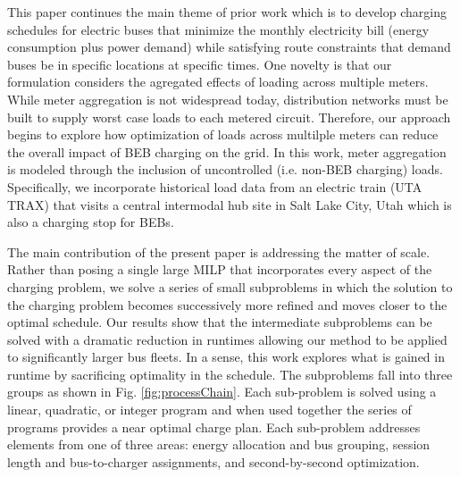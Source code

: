\par This paper continues the main theme of prior work which is to develop charging schedules for electric buses that minimize the monthly electricity bill (energy consumption plus power demand) while satisfying route constraints that demand buses be in specific locations at specific times.  One novelty is that our formulation considers the agregated effects of loading across multiple meters.  While meter aggregation is not widespread today, distribution networks must be built to supply worst case loads to each metered circuit.  Therefore, our approach begins to explore how optimization of loads across multilple meters can reduce the overall impact of BEB charging on the grid.  In this work, meter aggregation is modeled through the inclusion of uncontrolled (i.e. non-BEB charging) loads.  Specifically, we incorporate historical load data from an electric train (UTA TRAX) that visits a central intermodal hub site in Salt Lake City, Utah which is also a charging stop for BEBs.  
\par The main contribution of the present paper is addressing the matter of scale.  Rather than posing a single large MILP that incorporates every aspect of the charging problem, we solve a series of small subproblems in which the solution to the charging problem becomes successively more refined and moves closer to the optimal schedule.  Our results show that the intermediate subproblems can be solved with a dramatic reduction in runtimes allowing our method to be applied to significantly larger bus fleets.  In a sense, this work explores what is gained in runtime by sacrificing optimality in the schedule.  The subproblems fall into three groups as shown in Fig. \ref{fig:processChain}.  Each sub-problem is solved using a linear, quadratic, or integer program and when used together the series of programs provides a near optimal charge plan. Each sub-problem addresses elements from one of three areas: energy allocation and bus grouping, session length and bus-to-charger assignments, and second-by-second optimization.  

